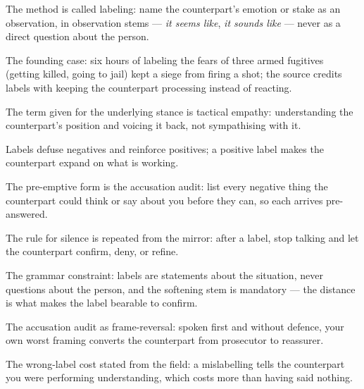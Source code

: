 

\begin{distilled}
  \item The method is called labeling: name the counterpart's emotion or stake as an observation, in observation stems --- \emph{it seems like}, \emph{it sounds like} --- never as a direct question about the person.
  \item The founding case: six hours of labeling the fears of three armed fugitives (getting killed, going to jail) kept a siege from firing a shot; the source credits labels with keeping the counterpart processing instead of reacting.
  \item The term given for the underlying stance is tactical empathy: understanding the counterpart's position and voicing it back, not sympathising with it.
  \item Labels defuse negatives and reinforce positives; a positive label makes the counterpart expand on what is working.
  \item The pre-emptive form is the accusation audit: list every negative thing the counterpart could think or say about you before they can, so each arrives pre-answered.
  \item The rule for silence is repeated from the mirror: after a label, stop talking and let the counterpart confirm, deny, or refine.
\end{distilled}

\begin{unique}
  \item The grammar constraint: labels are statements about the situation, never questions about the person, and the softening stem is mandatory --- the distance is what makes the label bearable to confirm.
  \item The accusation audit as frame-reversal: spoken first and without defence, your own worst framing converts the counterpart from prosecutor to reassurer.
  \item The wrong-label cost stated from the field: a mislabelling tells the counterpart you were performing understanding, which costs more than having said nothing.
\end{unique}
